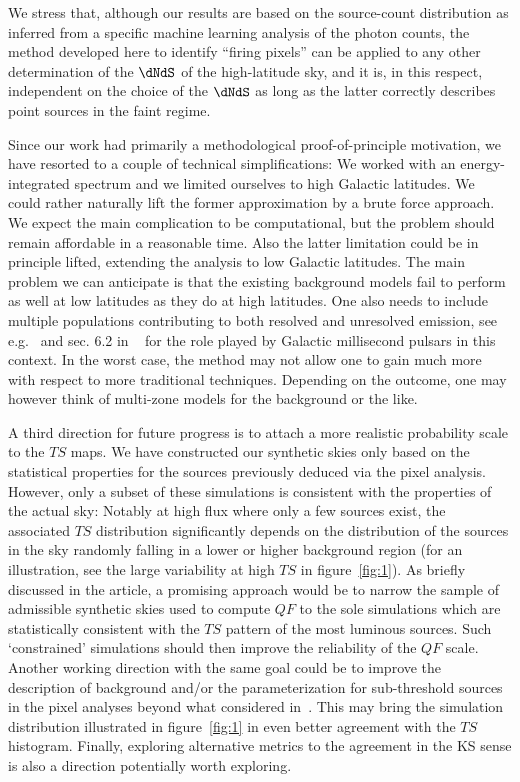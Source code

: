 We stress that, although our results are based on the source-count distribution as inferred from a specific machine learning analysis of the photon counts, the method developed here to identify ``firing pixels'' can be applied to any other determination of the $\dNdS$ of the high-latitude sky, and it is, in this respect, independent on the choice of the $\dNdS$ as long as the latter correctly describes point sources in the faint regime.

Since our work had primarily a methodological proof-of-principle motivation, we have resorted to a couple of technical simplifications: We worked with an energy-integrated spectrum and we limited ourselves to high Galactic latitudes. We could rather naturally lift the former approximation  by a brute force approach. We expect the main complication to be computational, but the problem should remain affordable in a reasonable time. Also the latter limitation could be in principle lifted, extending the analysis to low Galactic latitudes. The main problem we can anticipate is that the existing background models fail to perform as well at low latitudes as they do at high latitudes. One also needs to include multiple populations contributing to both resolved and unresolved emission, see e.g.~\cite{Calore:2014oga} and sec. 6.2 in ~\cite{Fermi-LAT:2015bhf} for the role played by Galactic millisecond pulsars in this context. In the worst case, the method may not allow one to gain much more with respect to more traditional techniques. Depending on the outcome, one may however think of multi-zone models for the background or the like.  

A third direction for future progress is to attach a  more realistic probability scale to the $TS$ maps. We have constructed our synthetic skies only based on the statistical properties for the sources previously deduced via the pixel analysis. However, only a subset of these simulations is consistent with the properties of the actual sky: Notably at high flux where only a few sources exist, the associated $TS$ distribution significantly depends on the distribution of the sources in the sky randomly falling in a lower or higher background region (for an illustration, see the large variability at high $TS$ in figure~\ref{fig:1}). As briefly discussed in the article, a promising approach would be to narrow the sample of admissible synthetic skies used to compute $QF$ to the sole simulations which are statistically consistent with the $TS$ pattern of the most luminous sources. Such `constrained' simulations should then improve the reliability of the $QF$ scale. Another working direction with the same goal could be to improve the description of background and/or the parameterization for sub-threshold sources in the pixel analyses beyond what considered in~\cite{Amerio:2023uet}. This may bring the simulation distribution illustrated in figure~\ref{fig:1} in even better agreement with the $TS$ histogram. Finally, exploring alternative  metrics to the agreement in the KS sense is also a direction potentially worth exploring. 


